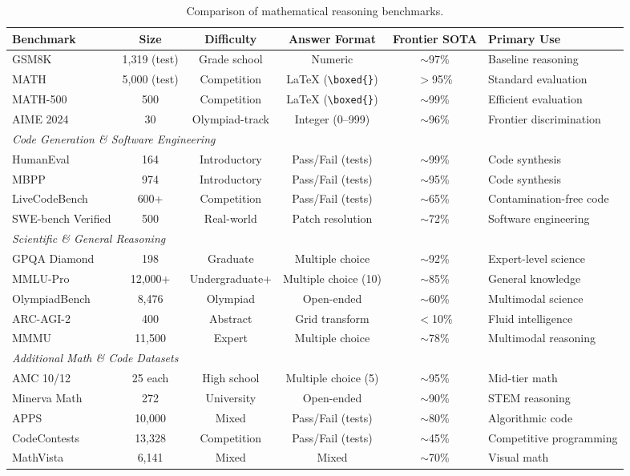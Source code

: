 \documentclass[12pt,a4paper]{report}
\theoremstyle{definition}
\begin{document}
\begin{table}[ht]
\centering
\caption{Comparison of mathematical reasoning benchmarks.}
\label{tab:math-benchmarks}
\small
\begin{tabular}{lccccl}
\toprule
\textbf{Benchmark} & \textbf{Size} & \textbf{Difficulty} & \textbf{Answer Format} & \textbf{Frontier SOTA} & \textbf{Primary Use} \\
\midrule
GSM8K & 1,319 (test) & Grade school & Numeric & $\sim$97\% & Baseline reasoning \\
MATH & 5,000 (test) & Competition & \LaTeX{} (\verb|\boxed{}|) & $>$95\% & Standard evaluation \\
MATH-500 & 500 & Competition & \LaTeX{} (\verb|\boxed{}|) & $\sim$99\% & Efficient evaluation \\
AIME 2024 & 30 & Olympiad-track & Integer (0--999) & $\sim$96\% & Frontier discrimination \\
\midrule
\multicolumn{6}{l}{\textit{Code Generation \& Software Engineering}} \\
\midrule
HumanEval & 164 & Introductory & Pass/Fail (tests) & $\sim$99\% & Code synthesis \\
MBPP & 974 & Introductory & Pass/Fail (tests) & $\sim$95\% & Code synthesis \\
LiveCodeBench & 600+ & Competition & Pass/Fail (tests) & $\sim$65\% & Contamination-free code \\
SWE-bench Verified & 500 & Real-world & Patch resolution & $\sim$72\% & Software engineering \\
\midrule
\multicolumn{6}{l}{\textit{Scientific \& General Reasoning}} \\
\midrule
GPQA Diamond & 198 & Graduate & Multiple choice & $\sim$92\% & Expert-level science \\
MMLU-Pro & 12,000+ & Undergraduate+ & Multiple choice (10) & $\sim$85\% & General knowledge \\
OlympiadBench & 8,476 & Olympiad & Open-ended & $\sim$60\% & Multimodal science \\
ARC-AGI-2 & 400 & Abstract & Grid transform & $<$10\% & Fluid intelligence \\
MMMU & 11,500 & Expert & Multiple choice & $\sim$78\% & Multimodal reasoning \\
\midrule
\multicolumn{6}{l}{\textit{Additional Math \& Code Datasets}} \\
\midrule
AMC 10/12 & 25 each & High school & Multiple choice (5) & $\sim$95\% & Mid-tier math \\
Minerva Math & 272 & University & Open-ended & $\sim$90\% & STEM reasoning \\
APPS & 10,000 & Mixed & Pass/Fail (tests) & $\sim$80\% & Algorithmic code \\
CodeContests & 13,328 & Competition & Pass/Fail (tests) & $\sim$45\% & Competitive programming \\
MathVista & 6,141 & Mixed & Mixed & $\sim$70\% & Visual math \\
\bottomrule
\end{tabular}
\end{table}
\end{document}
